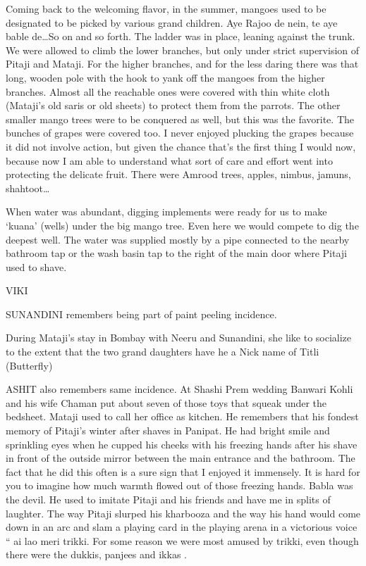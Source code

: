 Coming back to the welcoming flavor, in the summer, mangoes used to be designated to be picked by various grand children. Aye Rajoo de nein, te aye bable de…So on and so forth. The ladder was in place, leaning against the trunk. We were allowed to climb the lower branches, but only under strict supervision of Pitaji and Mataji. For the higher branches, and for the less daring there was that long, wooden pole with the hook to yank off the mangoes from the higher branches. Almost all the reachable ones were covered with thin white cloth (Mataji’s old saris or old sheets) to protect them from the parrots. The other smaller mango trees were to be conquered as well, but this was the favorite. The bunches of grapes were covered too. I never enjoyed plucking the grapes because it did not involve action, but given the chance that’s the first thing I would now, because now I am able to understand what sort of care and effort went into protecting the delicate fruit. There were Amrood trees, apples, nimbus, jamuns, shahtoot…

When water was abundant, digging implements were ready for us to make ‘kuana’ (wells) under the big mango tree. Even here we would compete to dig the deepest well. The water was supplied mostly by a pipe connected to the nearby bathroom tap or the wash basin tap to the right of the main door where Pitaji used to shave. 


VIKI


SUNANDINI remembers being part of paint peeling incidence. 

During Mataji’s stay in Bombay with Neeru and Sunandini, she like to socialize to the extent that the two grand daughters have he a Nick name of Titli (Butterfly) 

ASHIT also remembers same incidence. 
At Shashi Prem wedding Banwari Kohli and his wife Chaman put about seven of those toys that squeak under the bedsheet. Mataji used to call her office as kitchen. 
He remembers that his fondest memory of Pitaji’s winter after shaves in Panipat. He had bright smile and sprinkling eyes when he cupped his cheeks with his freezing hands after his shave in front of the outside mirror between the main entrance and the bathroom. The fact that he did this often is a sure sign that I enjoyed it immensely. It is hard for you to imagine how much warmth flowed out of those freezing hands. Babla was the devil. He used to imitate Pitaji and his friends and have me in splits of laughter. The way Pitaji slurped his kharbooza and the way his hand would come down in an arc and slam a playing card in the playing arena in a victorious voice “ ai lao meri trikki. For some reason we were most amused by trikki, even though there were the dukkis, panjees and ikkas .

